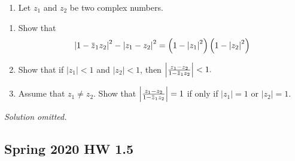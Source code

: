 \begin{problem}[?]

\begin{enumerate}
\def\labelenumi{\arabic{enumi}.}
\tightlist
\item
  Let \(z_{1}\) and \(z_{2}\) be two complex numbers.
\end{enumerate}

\begin{enumerate}
\def\labelenumi{(\alph{enumi})}
\item
  Show that
  \begin{align*}
  \left|1-\mkern 1.5mu\overline{\mkern-1.5muz\mkern-1.5mu}\mkern 1.5mu_{1} z_{2}\right|^{2}-\left|z_{1}-z_{2}\right|^{2}=\left(1-\left|z_{1}\right|^{2}\right)\left(1-\left|z_{2}\right|^2\right)
  \end{align*}
\item
  Show that if \(\left|z_{1}\right|<1\) and \(\left|z_{2}\right|<1\),
  then
  \(\left|\frac{z_{1}-z_{2}}{1-\mkern 1.5mu\overline{\mkern-1.5muz\mkern-1.5mu}\mkern 1.5mu_{1} z_{2}}\right|<1 .\)
\item
  Assume that \(z_{1} \neq z_{2}\). Show that
  \(\left|\frac{z_{1}-z_{2}}{1-\mkern 1.5mu\overline{\mkern-1.5muz\mkern-1.5mu}\mkern 1.5mu_{1} z_{2}}\right|=1\)
  if only if \(\left|z_{1}\right|=1\) or \(\left|z_{2}\right|=1\).
\end{enumerate}

\end{problem}

\emph{Solution omitted.}

\hypertarget{spring-2020-hw-1.5}{%
\subsection{Spring 2020 HW 1.5}\label{spring-2020-hw-1.5}}

